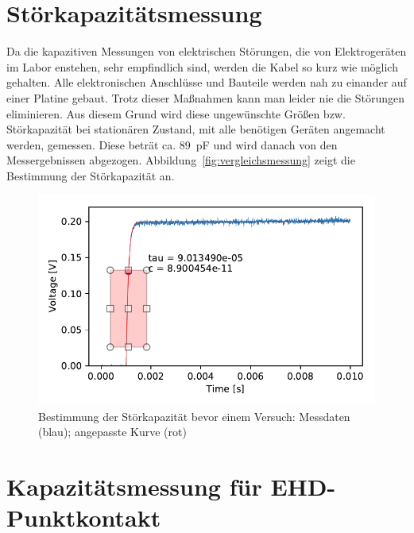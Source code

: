 \section{Störkapazitätsmessung}
\label{sec:stoerkapazitaetsmessung}

Da die kapazitiven Messungen von elektrischen Störungen, die von Elektrogeräten im Labor enstehen, sehr empfindlich sind, werden die Kabel so kurz wie möglich gehalten.
Alle elektronischen Anschlüsse und Bauteile werden nah zu einander auf einer Platine gebaut.
Trotz dieser Maßnahmen kann man leider nie die Störungen eliminieren.
Aus diesem Grund wird diese ungewünschte Größen bzw. Störkapazität bei stationären Zustand, mit alle benötigen Geräten angemacht werden, gemessen.
Diese beträt ca. \SI{89}{\pico\farad} und wird danach von den Messergebnissen abgezogen.
Abbildung~\ref{fig:vergleichsmessung} zeigt die Bestimmung der Störkapazität an.

\begin{figure}[htb]
    \centering
    \includegraphics[]{./images/background_capacitance.pdf}
    \caption{Bestimmung der Störkapazität bevor einem Versuch: Messdaten (blau); angepasste Kurve (rot)}
    \label{fig:background_capacitance}
\end{figure}

\section{Kapazitätsmessung für EHD-Punktkontakt}
\label{sec:kapazitaetsmessung_punktkontakt}

